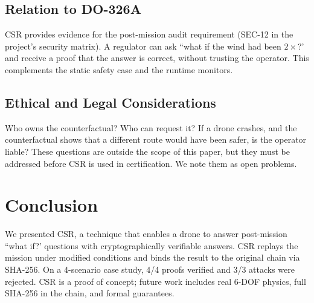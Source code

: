 \subsection{Relation to DO-326A}
CSR provides evidence for the post-mission audit requirement
(SEC-12 in the project's security matrix). A regulator can ask
``what if the wind had been $2\times$?' and receive a proof that
the answer is correct, without trusting the operator. This
complements the static safety case and the runtime monitors.

\subsection{Ethical and Legal Considerations}
Who owns the counterfactual? Who can request it? If a drone
crashes, and the counterfactual shows that a different route would
have been safer, is the operator liable? These questions are
outside the scope of this paper, but they must be addressed before
CSR is used in certification. We note them as open problems.

\section{Conclusion}
We presented CSR, a technique that enables a drone to answer
post-mission ``what if?' questions with cryptographically
verifiable answers. CSR replays the mission under modified
conditions and binds the result to the original chain via SHA-256.
On a 4-scenario case study, 4/4 proofs verified and 3/3 attacks
were rejected. CSR is a proof of concept; future work includes
real 6-DOF physics, full SHA-256 in the chain, and formal
guarantees.
